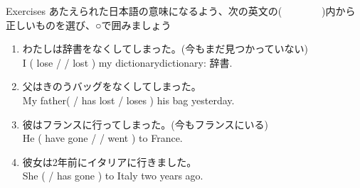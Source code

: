 \documentclass[aspectratio=169,xcolor={dvipsnames,table}]{beamer}
\newcommand{\myaudio}[1]{\href{#1}{\faVolumeUp}}
\begin{document}
\begin{frame}[plain]{Exercises}
 あたえられた日本語の意味になるよう、次の英文の(~~~~~~~~)内から正しいものを選び、○で囲みましょう%
\mbox{}\hfill{\scriptsize \myaudio{./audio/014_have_pp_kekka_05.mp3}}


\begin{enumerate}
 \item わたしは辞書をなくしてしまった。{\footnotesize (今もまだ見つかっていない)}\\
I  ( lose /  / lost ) my dictionary\hfill{\small dictionary: 辞書}.
 \item 父はきのうバッグをなくしてしまった。\\
My father(  / has lost / loses ) his bag yesterday.
 \item 彼はフランスに行ってしまった。{\footnotesize (今もフランスにいる)}\\
He ( have gone / / went  ) to France.
 \item 彼女は2年前にイタリアに行きました。\\
She (  / has gone ) to Italy two years ago.
\end{enumerate}
\end{frame}
\end{document}
